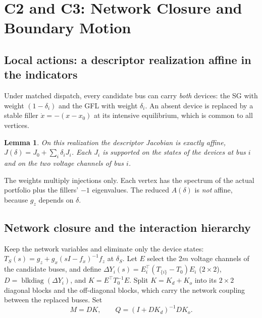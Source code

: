 \documentclass[journal]{IEEEtran}
\newtheorem{lemma}{Lemma}
\theoremstyle{definition}
\theoremstyle{remark}
\DeclareMathOperator{\blkdiag}{blkdiag}
\begin{document}
\section{C2 and C3: Network Closure and Boundary Motion}\label{sec:closure}

\subsection{Local actions: a descriptor realization affine in the indicators}
Under matched dispatch, every candidate bus can carry \emph{both} devices: the
SG with weight $(1-\delta_i)$ and the GFL with weight $\delta_i$. An absent
device is replaced by a stable filler $\dot x=-(x-x_0)$ at its intensive
equilibrium, which is common to all vertices.

\begin{lemma}\label{lem:affine}
On this realization the descriptor Jacobian is exactly affine,
$J(\delta)=J_0+\sum_i\delta_iJ_i$. Each $J_i$ is supported on the states of the
devices at bus $i$ and on the two voltage channels of bus $i$.
\end{lemma}
The weights multiply injections only. Each vertex has the spectrum of the
actual portfolio plus the fillers' $-1$ eigenvalues. The reduced $A(\delta)$
is \emph{not} affine, because $g_z$ depends on $\delta$.

\subsection{Network closure and the interaction hierarchy}
Keep the network variables and eliminate only the device states:
$T_S(s)=g_z+g_x(sI-f_x)^{-1}f_z$ at $\delta_S$. Let $E$ select the $2m$
voltage channels of the candidate buses, and define
$\Delta Y_i(s)=E_i^\top(T_{\{i\}}-T_0)E_i$ ($2\times 2$),
$D=\blkdiag(\Delta Y_i)$, and $K=E^\top T_0^{-1}E$. Split $K=K_d+K_o$ into its
$2\times2$ diagonal blocks and the off-diagonal blocks, which carry the network
coupling between the replaced buses. Set
\begin{equation}\label{eq:Q}
M=DK,\qquad Q=(I+DK_d)^{-1}DK_o .
\end{equation}
\end{document}
